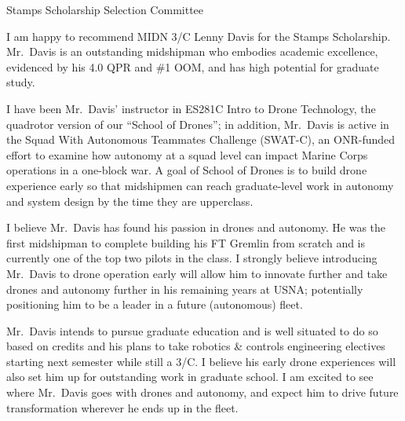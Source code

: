 \documentclass[12pt]{wrceletter}
\date{\today}
\begin{document}
\begin{letter}{%
Stamps Scholarship Selection Committee}

\opening{}
\raggedright %
\setlength{\parindent}{15pt} %

I am happy to recommend MIDN 3/C Lenny Davis for the Stamps Scholarship.  Mr.~Davis is an outstanding midshipman who embodies academic excellence, evidenced by his 4.0 QPR and \#1 OOM, and has high potential for graduate study.  

I have been Mr.~Davis’ instructor in ES281C Intro to Drone Technology, the quadrotor version of our ``School of Drones''; in addition, Mr.~Davis is active in the Squad With Autonomous Teammates Challenge (SWAT-C), an ONR-funded effort to examine how autonomy at a squad level can impact Marine Corps operations in a one-block war. A goal of School of Drones is to build drone experience early so that midshipmen can reach graduate-level work in autonomy and system design by the time they are upperclass. 

I believe Mr.~Davis has found his passion in drones and autonomy. He was the first midshipman to complete building his FT Gremlin from scratch and is currently one of the top two pilots in the class. I strongly believe introducing Mr.~Davis to drone operation early will allow him to innovate further and take drones and autonomy further in his remaining years at USNA; potentially positioning him to be a leader in a future (autonomous) fleet. 

Mr.~Davis intends to pursue graduate education and is well situated to do so based on credits and his plans to take robotics \& controls engineering electives starting next semester while still a 3/C. I believe his early drone experiences will also set him up for outstanding work in graduate school. I am excited to see where Mr.~Davis goes with drones and autonomy, and expect him to drive future transformation wherever he ends up in the fleet.

\closing{~} %

\end{letter}
\end{document}
